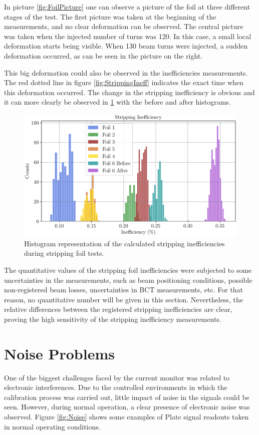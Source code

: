 In picture \ref{fig:FoilPicture} one can observe a picture of the foil at three different stages of the test. The first picture was taken at the beginning of the measurements, and no clear deformation can be observed. The central picture was taken when the injected number of turns was 120. In this case, a small local deformation starts being visible. When 130 beam turns were injected, a sudden deformation occurred, as can be seen in the picture on the right. 

This big deformation could also be observed in the inefficiencies measurements. The red dotted line in figure \ref{fig:StrippingIneff} indicates the exact time when this deformation occurred. The change in the stripping inefficiency is obvious and it can more clearly be observed in \ref{fig:Histo} with the before and after histograms. 

\begin{figure}[h]
    \centering
    \includegraphics[width=0.75\columnwidth]{StrippingEfficiency13April/Histo.pdf}
    \caption{Histogram representation of the calculated stripping inefficiencies during stripping foil tests. }
    \label{fig:Histo}
\end{figure}

The quantitative values of the stripping foil inefficiencies were subjected to some uncertainties in the measurements, such as beam positioning conditions, possible non-registered beam losses, uncertainties in BCT measurements, etc. For that reason, no quantitative number will be given in this section. Nevertheless, the relative differences between the registered stripping inefficiencies are clear, proving the high sensitivity of the stripping inefficiency measurements. 

\section{Noise Problems}

One of the biggest challenges faced by the \hzhm current monitor was related to electronic interferences. Due to the controlled environments in which the calibration process was carried out, little impact of noise in the signals could be seen. However, during normal operation, a clear presence of electronic noise was observed. Figure \ref{fig:Noise} shows some examples of Plate signal readouts taken in normal operating conditions. 


